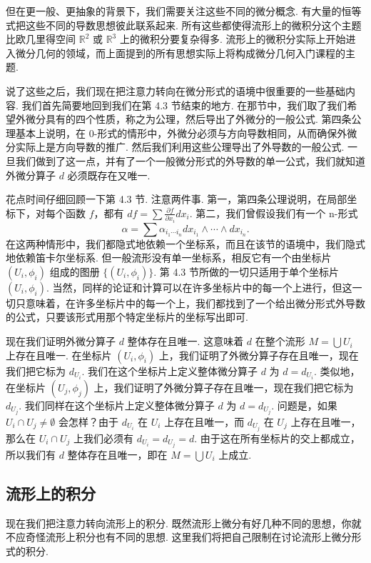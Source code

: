但在更一般、更抽象的背景下，我们需要关注这些不同的微分概念. 有大量的恒等式把这些不同的导数思想彼此联系起来. 所有这些都使得流形上的微积分这个主题比欧几里得空间 $\mathbb{R}^2$ 或 $\mathbb{R}^3$ 上的微积分要复杂得多. 流形上的微积分实际上开始进入微分几何的领域，而上面提到的所有思想实际上将构成微分几何入门课程的主题.

说了这些之后，我们现在把注意力转向在微分形式的语境中很重要的一些基础内容. 我们首先简要地回到我们在第 4.3 节结束的地方. 在那节中，我们取了我们希望外微分具有的四个性质，称之为公理，然后导出了外微分的一般公式. 第四条公理基本上说明，在 0-形式的情形中，外微分必须与方向导数相同，从而确保外微分实际上是方向导数的推广. 然后我们利用这些公理导出了外导数的一般公式. 一旦我们做到了这一点，并有了一个一般微分形式的外导数的单一公式，我们就知道外微分算子 $d$ 必须既存在又唯一.

花点时间仔细回顾一下第 4.3 节. 注意两件事. 第一，第四条公理说明，在局部坐标下，对每个函数 $f$，都有 $df=\sum\frac{\partial f}{\partial x_i}dx_i$. 第二，我们曾假设我们有一个 n-形式
\[
\alpha=\sum\alpha_{i_1\cdots i_n}dx_{i_1}\wedge\cdots\wedge dx_{i_n}.
\]
在这两种情形中，我们都隐式地依赖一个坐标系，而且在该节的语境中，我们隐式地依赖笛卡尔坐标系. 但一般流形没有单一坐标系，相反它有一个由坐标片 $(U_i,\phi_i)$ 组成的图册 $\{(U_i,\phi_i)\}$. 第 4.3 节所做的一切只适用于单个坐标片 $(U_i,\phi_i)$. 当然，同样的论证和计算可以在许多坐标片中的每一个上进行，但这一切只意味着，在许多坐标片中的每一个上，我们都找到了一个给出微分形式外导数的公式，只要该形式用那个特定坐标片的坐标写出即可.

现在我们证明外微分算子 $d$ 整体存在且唯一. 这意味着 $d$ 在整个流形 $M=\bigcup U_i$ 上存在且唯一. 在坐标片 $(U_i,\phi_i)$ 上，我们证明了外微分算子存在且唯一，现在我们把它标为 $d_{U_i}$. 我们在这个坐标片上定义整体微分算子 $d$ 为 $d=d_{U_i}$. 类似地，在坐标片 $(U_j,\phi_j)$ 上，我们证明了外微分算子存在且唯一，现在我们把它标为 $d_{U_j}$. 我们同样在这个坐标片上定义整体微分算子 $d$ 为 $d=d_{U_j}$. 问题是，如果 $U_i\cap U_j\neq\emptyset$ 会怎样？由于 $d_{U_i}$ 在 $U_i$ 上存在且唯一，而 $d_{U_j}$ 在 $U_j$ 上存在且唯一，那么在 $U_i\cap U_j$ 上我们必须有 $d_{U_i}=d_{U_j}=d$. 由于这在所有坐标片的交上都成立，所以我们有 $d$ 整体存在且唯一，即在 $M=\bigcup U_i$ 上成立.

\subsection{流形上的积分}

现在我们把注意力转向流形上的积分. 既然流形上微分有好几种不同的思想，你就不应奇怪流形上积分也有不同的思想. 这里我们将把自己限制在讨论流形上微分形式的积分.

